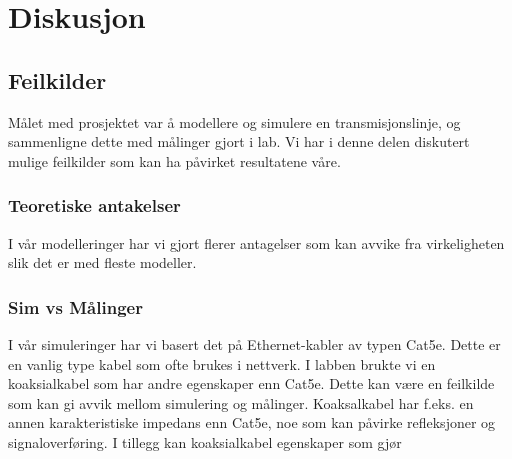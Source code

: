 \section{Diskusjon}
\subsection{Feilkilder}
Målet med prosjektet var å modellere og simulere en transmisjonslinje, og sammenligne dette med målinger gjort i lab. Vi har i denne delen diskutert mulige feilkilder som kan ha påvirket resultatene våre.
\subsubsection{Teoretiske antakelser}
I vår modelleringer har vi gjort flerer antagelser som kan avvike fra virkeligheten slik det er med fleste modeller. 
\subsubsection{Sim vs Målinger}
I vår simuleringer har vi basert det på Ethernet-kabler av typen Cat5e. Dette er en vanlig type kabel som ofte brukes i nettverk. I labben brukte vi en koaksialkabel som har andre egenskaper enn Cat5e. Dette kan være en feilkilde som kan gi avvik mellom simulering og målinger. Koaksalkabel har f.eks. en annen karakteristiske impedans enn Cat5e, noe som kan påvirke refleksjoner og signaloverføring. I tillegg kan koaksialkabel egenskaper som gjør 